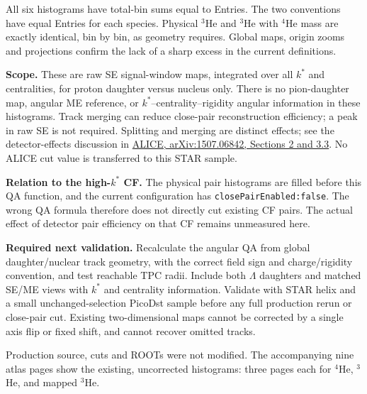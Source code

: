 \documentclass[10pt,a4paper]{article}
\begin{document}
All six histograms have total-bin sums equal to Entries. The two conventions have equal Entries for each species.
Physical $^3$He and $^3$He with $^4$He mass are exactly identical, bin by bin, as geometry requires.
Global maps, origin zooms and projections confirm the lack of a sharp excess in the current definitions.

\textbf{Scope.} These are raw SE signal-window maps, integrated over all $k^*$ and centralities, for
proton daughter versus nucleus only. There is no pion-daughter map, angular ME reference,
or $k^*$--centrality--rigidity angular information in these histograms.
Track merging can reduce close-pair reconstruction efficiency; a peak in raw SE is not required.
Splitting and merging are distinct effects; see the detector-effects discussion in
\href{https://arxiv.org/pdf/1507.06842}{ALICE, arXiv:1507.06842, Sections 2 and 3.3}.
No ALICE cut value is transferred to this STAR sample.

\textbf{Relation to the high-$k^*$ CF.} The physical pair histograms are filled before this QA function,
and the current configuration has \texttt{closePairEnabled:false}.
The wrong QA formula therefore does not directly cut existing CF pairs.
The actual effect of detector pair efficiency on that CF remains unmeasured here.

\textbf{Required next validation.} Recalculate the angular QA from global daughter/nuclear track geometry,
with the correct field sign and charge/rigidity convention, and test reachable TPC radii.
Include both $\Lambda$ daughters and matched SE/ME views with $k^*$ and centrality information.
Validate with STAR helix and a small unchanged-selection PicoDst sample before any full production rerun or close-pair cut.
Existing two-dimensional maps cannot be corrected by a single axis flip or fixed shift, and cannot recover omitted tracks.

Production source, cuts and ROOTs were not modified. The accompanying nine atlas pages show the existing, uncorrected
histograms: three pages each for $^4$He, $^3$He, and mapped $^3$He.

\end{document}
